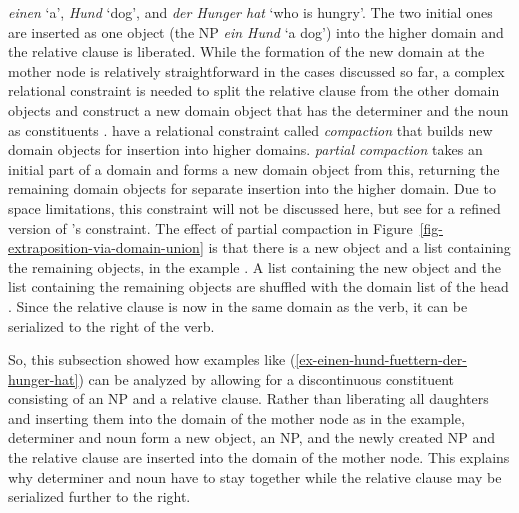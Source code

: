 \documentclass[output=paper
	        ,collection
	        ,collectionchapter
 	        ,biblatex
                ,babelshorthands
                ,newtxmath
                ,draftmode
                ,colorlinks, citecolor=brown
]{langscibook}
\begin{document}
\emph{einen} `a', \emph{Hund} `dog', and \emph{der Hunger hat} `who is hungry'. The two initial ones
are inserted as one object (the NP \emph{ein Hund} `a dog') into the higher domain
and the relative clause is liberated. While the formation of the new domain at the mother node is
relatively straightforward in the cases discussed so far, a complex relational constraint is needed
to split the relative clause  from the other domain objects and construct a new domain
object that has the determiner and the noun as constituents . \citeauthor{KP95a} have a relational constraint called
\textit{compaction} that builds new domain objects for insertion into higher
domains. \textit{partial compaction} takes an initial part of a domain and forms a new domain object
from this, returning the remaining domain objects for separate insertion into the higher domain. Due
to space limitations, this constraint will not be discussed here, but see  for a refined version of \citeauthor{KP95a}'s constraint. The effect of partial
compaction in Figure~\ref{fig-extraposition-via-domain-union} is that there is a new object 
and a list containing the remaining objects, in the example . A list containing
the new object  and the list containing the remaining objects  are
shuffled with the domain list of the head . Since the relative clause is now in the same domain
as the verb, it can be serialized to the right of the verb.

So, this subsection showed how examples like (\ref{ex-einen-hund-fuettern-der-hunger-hat}) can be
analyzed by allowing for a discontinuous constituent consisting of an NP and a relative
clause. Rather than liberating all daughters and inserting them into the domain of the mother node
as in the  example, determiner and noun form a new object, an NP, and the newly created NP
and the relative clause are inserted into the domain of the mother node. This explains why
determiner and noun have to stay together while the relative clause may be serialized further to the right.

\end{document}
